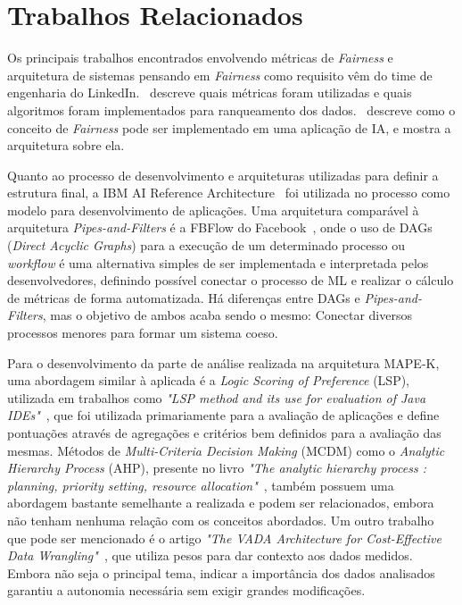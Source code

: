 \documentclass[Portugues,Final]{ic-tese-v3}
\begin{document}
\section{Trabalhos Relacionados}
\label{sec:TrabalhosRelacionados}

Os principais trabalhos encontrados envolvendo métricas de \textit{Fairness} e arquitetura de sistemas pensando em \textit{Fairness} como requisito vêm do time de engenharia do LinkedIn.~\cite{Geyik_2019} descreve quais métricas foram utilizadas e quais algoritmos foram implementados para ranqueamento dos dados.~\cite{Kenthapadi_2019} descreve como o conceito de \textit{Fairness} pode ser implementado em uma aplicação de IA, e mostra a arquitetura sobre ela.

Quanto ao processo de desenvolvimento e arquiteturas utilizadas para definir a estrutura final, a IBM AI Reference Architecture~\cite{IBM_2021} foi utilizada no processo como modelo para desenvolvimento de aplicações. Uma arquitetura comparável à arquitetura \textit{Pipes-and-Filters} é a FBFlow do Facebook~\cite{Dunn_2016}, onde o uso de DAGs (\textit{Direct Acyclic Graphs}) para a execução de um determinado processo ou \textit{workflow} é uma alternativa simples de ser implementada e interpretada pelos desenvolvedores, definindo possível conectar o processo de ML e realizar o cálculo de métricas de forma automatizada. Há diferenças entre DAGs e \textit{Pipes-and-Filters}, mas o objetivo de ambos acaba sendo o mesmo: Conectar diversos processos menores para formar um sistema coeso.

Para o desenvolvimento da parte de análise realizada na arquitetura MAPE-K, uma abordagem similar à aplicada é a \textit{Logic Scoring of Preference} (LSP), utilizada em trabalhos como \textit{"LSP method and its use for evaluation of Java IDEs"}~\cite{Dujmovic_2006}, que foi utilizada primariamente para a avaliação de aplicações e define pontuações através de agregações e critérios bem definidos para a avaliação das mesmas. Métodos de \textit{Multi-Criteria Decision Making} (MCDM) como o \textit{Analytic Hierarchy Process} (AHP), presente no livro \textit{"The analytic hierarchy process : planning, priority setting, resource allocation"}~\cite{Saaty_1980}, também possuem uma abordagem bastante semelhante a realizada e podem ser relacionados, embora não tenham nenhuma relação com os conceitos abordados. Um outro trabalho que pode ser mencionado é o artigo \textit{"The VADA Architecture for Cost-Effective Data Wrangling"}~\cite{Konstantinou_2017}, que utiliza pesos para dar contexto aos dados medidos. Embora não seja o principal tema, indicar a importância dos dados analisados garantiu a autonomia necessária sem exigir grandes modificações.
\end{document}

